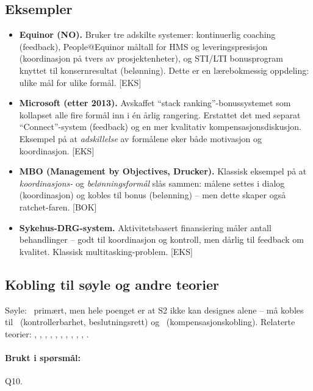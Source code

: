 \subsection*{Eksempler}
\begin{itemize}
\item \textbf{Equinor (NO).} Bruker tre adskilte systemer: kontinuerlig coaching (feedback), People@Equinor måltall for HMS og leveringspresisjon (koordinasjon på tvers av prosjektenheter), og STI/LTI bonusprogram knyttet til konsernresultat (belønning). Dette er en lærebokmessig oppdeling: ulike mål for ulike formål. [EKS]
\item \textbf{Microsoft (etter 2013).} Avskaffet ``stack ranking''-bonussystemet som kollapset alle fire formål inn i én årlig rangering. Erstattet det med separat ``Connect''-system (feedback) og en mer kvalitativ kompensasjonsdiskusjon. Eksempel på at \emph{adskillelse} av formålene øker både motivasjon og koordinasjon. [EKS]
\item \textbf{MBO (Management by Objectives, Drucker).} Klassisk eksempel på at \emph{koordinasjons-} og \emph{belønningsformål} slås sammen: målene settes i dialog (koordinasjon) og kobles til bonus (belønning) -- men dette skaper også ratchet-faren. [BOK]
\item \textbf{Sykehus-DRG-system.} Aktivitetsbasert finansiering måler antall behandlinger -- godt til koordinasjon og kontroll, men dårlig til feedback om kvalitet. Klassisk multitasking-problem. [EKS]
\end{itemize}

\subsection*{Kobling til søyle og andre teorier}
Søyle: \STwo\ primært, men hele poenget er at S2 ikke kan designes alene -- må kobles til \SOne\ (kontrollerbarhet, beslutningsrett) og \SThree\ (kompensasjonskobling). Relaterte teorier: , , , , , , , , , , .

\paragraph{Brukt i spørsmål:} Q10.
